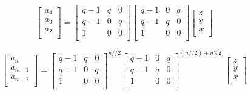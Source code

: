 \documentclass[paper.tex]{subfiles}
\begin{document}
\[
\left[ \begin{array}{ccc}
a_{4} \\
a_{3} \\
a_{2} \\
\end{array} \right]
=
\left[ \begin{array}{ccc}
q-1 & q & 0 \\
q-1 & 0 & q \\
1 & 0 & 0 \\
\end{array} \right]
\left[ \begin{array}{ccc}
q-1 & 0 & q \\
q-1 & q & 0 \\
1 & 0 & 0 \\
\end{array} \right]
\left[ \begin{array}{ccc}
z \\
y \\
x \\
\end{array} \right]
\]

\[
\left[ \begin{array}{ccc}
a_{n} \\
a_{n-1} \\
a_{n-2} \\
\end{array} \right]
=
\left[ \begin{array}{ccc}
q-1 & q & 0 \\
q-1 & 0 & q \\
1 & 0 & 0 \\
\end{array} \right] ^{n//2}
\left[ \begin{array}{ccc}
q-1 & 0 & q \\
q-1 & q & 0 \\
1 & 0 & 0 \\
\end{array} \right] ^{(n//2) + n\%2)}
\left[ \begin{array}{ccc}
z \\
y \\
x \\
\end{array} \right]
\]
\end{document}
